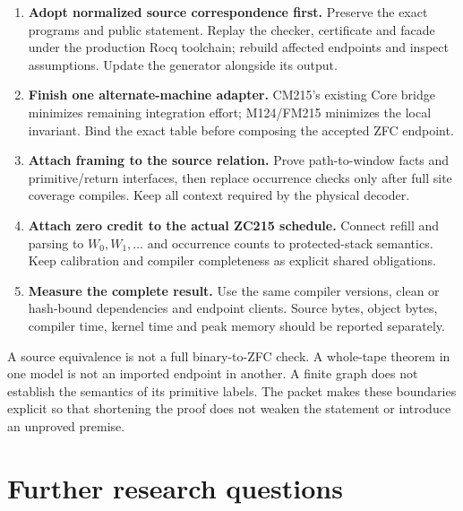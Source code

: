 \documentclass[11pt]{article}
\begin{document}
\begin{enumerate}
\item \textbf{Adopt normalized source correspondence first.} Preserve the exact
programs and public statement. Replay the checker, certificate and facade under
the production Rocq toolchain; rebuild affected endpoints and inspect assumptions.
Update the generator alongside its output.
\item \textbf{Finish one alternate-machine adapter.} CM215's existing Core bridge
minimizes remaining integration effort; M124/FM215 minimizes the local invariant.
Bind the exact table before composing the accepted ZFC endpoint.
\item \textbf{Attach framing to the source relation.} Prove path-to-window facts
and primitive/return interfaces, then replace occurrence checks only after full
site coverage compiles. Keep all context required by the physical decoder.
\item \textbf{Attach zero credit to the actual ZC215 schedule.} Connect refill and
parsing to $W_0,W_1,\ldots$ and occurrence counts to protected-stack semantics.
Keep calibration and compiler completeness as explicit shared obligations.
\item \textbf{Measure the complete result.} Use the same compiler versions,
clean or hash-bound dependencies and endpoint clients. Source bytes, object
bytes, compiler time, kernel time and peak memory should be reported separately.
\end{enumerate}

A source equivalence is not a full binary-to-ZFC check. A whole-tape theorem
in one model is not an imported endpoint in another. A finite graph does not
establish the semantics of its primitive labels. The packet makes these
boundaries explicit so that shortening the proof does not weaken the statement
or introduce an unproved premise.

\section{Further research questions}
\end{document}
